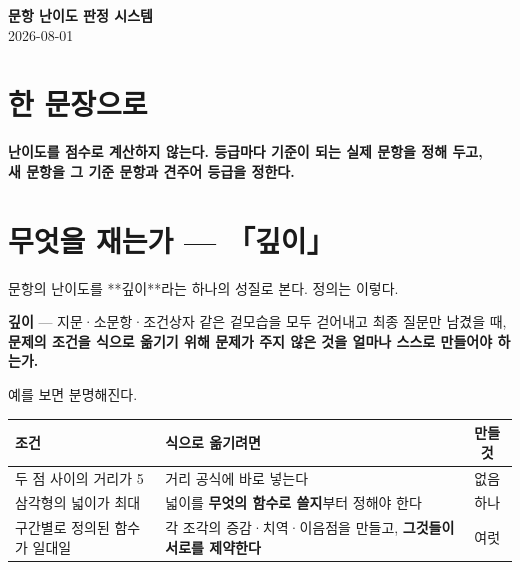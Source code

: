 \documentclass[11pt]{article}
\begin{document}
\begin{center}
{\LARGE\bfseries\color{navy} 문항 난이도 판정 시스템}\\[5pt]
{\color{muted} 2026-08-01}
\end{center}
\vspace{5mm}

\section{한 문장으로}

\begin{center}
\colorbox{pale}{\parbox{0.92\textwidth}{\vspace{2mm}\centering
\textbf{난이도를 점수로 계산하지 않는다. 등급마다 기준이 되는 실제 문항을 정해 두고,\\
새 문항을 그 기준 문항과 견주어 등급을 정한다.}\vspace{2mm}}}
\end{center}

\section{무엇을 재는가 — 「깊이」}

문항의 난이도를 **깊이**라는 하나의 성질로 본다. 정의는 이렇다.

\begin{center}
\colorbox{pale}{\parbox{0.92\textwidth}{\vspace{2mm}
\textbf{깊이} — 지문·소문항·조건상자 같은 겉모습을 모두 걷어내고 최종 질문만 남겼을 때,
\textbf{문제의 조건을 식으로 옮기기 위해 문제가 주지 않은 것을 얼마나 스스로 만들어야 하는가.}
\vspace{2mm}}}
\end{center}

예를 보면 분명해진다.

\begin{center}
\begin{tabular}{@{}p{52mm}p{62mm}c@{}}
\toprule
\textbf{조건} & \textbf{식으로 옮기려면} & \textbf{만들 것} \\
\midrule
두 점 사이의 거리가 5 & 거리 공식에 바로 넣는다 & 없음 \\
삼각형의 넓이가 최대 & 넓이를 \textbf{무엇의 함수로 쓸지}부터 정해야 한다 & 하나 \\
구간별로 정의된 함수가 일대일 & 각 조각의 증감·치역·이음점을 만들고, \textbf{그것들이 서로를 제약한다} & 여럿 \\
\bottomrule
\end{tabular}
\end{center}
\end{document}
